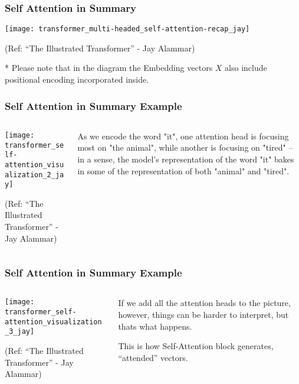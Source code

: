 \begin{frame}[fragile]\frametitle{Self Attention in Summary}


\begin{center}
\texttt{[image: transformer\_multi-headed\_self-attention-recap\_jay]}


{\tiny (Ref: ``The Illustrated Transformer'' - Jay Alammar)}
\end{center}	


* Please note that in the diagram the Embedding vectors $X$ also include positional encoding incorporated inside.	

\end{frame}


\begin{frame}[fragile]\frametitle{Self Attention in Summary Example}

\begin{columns}
    \begin{column}[T]{0.5\linewidth}
\begin{center}
\texttt{[image: transformer\_self-attention\_visualization\_2\_jay]}


{\tiny (Ref: ``The Illustrated Transformer'' - Jay Alammar)}
\end{center}	
		\end{column}
    \begin{column}[T]{0.5\linewidth}

As we encode the word "it", one attention head is focusing most on "the animal", while another is focusing on "tired" -- in a sense, the model's representation of the word "it" bakes in some of the representation of both "animal" and "tired".
    \end{column}
  \end{columns}
\end{frame}

\begin{frame}[fragile]\frametitle{Self Attention in Summary Example}

\begin{columns}
    \begin{column}[T]{0.5\linewidth}

\begin{center}
\texttt{[image: transformer\_self-attention\_visualization\_3\_jay]}


{\tiny (Ref: ``The Illustrated Transformer'' - Jay Alammar)}
\end{center}	
		\end{column}
    \begin{column}[T]{0.5\linewidth}
If we add all the attention heads to the picture, however, things can be harder to interpret, but thats what happens.

This is how Self-Attention block generates, ``attended'' vectors.
    \end{column}
  \end{columns}
\end{frame}

